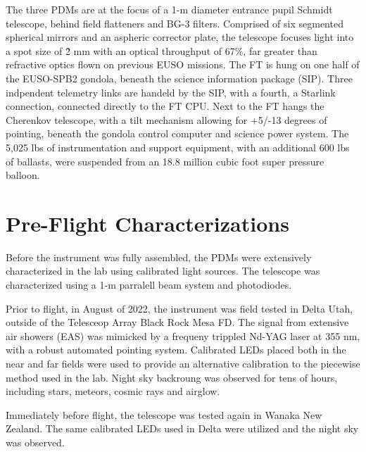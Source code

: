 \documentclass[a4paper,11pt]{article}
\begin{document}
The three PDMs are at the focus of a 1-m diameter entrance pupil Schmidt telescope, behind field flatteners and BG-3 filters. 
Comprised of six segmented spherical mirrors and an aspheric corrector plate, the telescope focuses light into a spot size of \~2 mm with an optical throughput of 67\%, far greater than refractive optics flown on previous EUSO missions. 
The FT is hung on one half of the EUSO-SPB2 gondola, beneath the science information package (SIP).
Three indpendent telemetry links are handeld by the SIP, with a fourth, a Starlink connection, connected directly to the FT CPU.  
Next to the FT hangs the Cherenkov telescope, with a tilt mechanism allowing for +5/-13 degrees of pointing, beneath the gondola control computer and science power system. 
The 5,025 lbs of instrumentation and support equipment, with an additional 600 lbs of ballasts, were suspended from an 18.8 million cubic foot super pressure balloon.


\section {Pre-Flight Characterizations}

Before the instrument was fully assembled, the PDMs were extensively characterized in the lab using calibrated light sources. 
The telescope was characterized using a 1-m parralell beam system and photodiodes. 

Prior to flight, in August of 2022, the instrument was field tested in Delta Utah, outside of the Telesceop Array Black Rock Mesa FD. 
The signal from extensive air showers (EAS) was mimicked by a frequeny trippled Nd-YAG laser at 355 nm, with a robust automated pointing system. 
Calibrated LEDs placed both in the near and far fields were used to provide an alternative calibration to the piecewise method used in the lab.
Night sky backroung was observed for tens of hours, including stars, meteors, cosmic rays and airglow. 

Immediately before flight, the telescope was tested again in Wanaka New Zealand. 
The same calibrated LEDs used in Delta were utilized and the night sky was observed.
\end{document}
